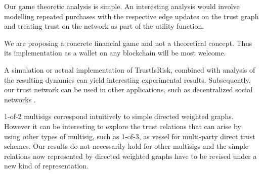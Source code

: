   Our game theoretic analysis is simple. An interesting analysis would involve modelling repeated purchases with the
  respective edge updates on the trust graph and treating trust on the network as part of the utility function.

  We are proposing a concrete financial game and not a theoretical concept. Thus its implementation as a wallet on any
  blockchain will be most welcome.

  A simulation or actual implementation of TrustIsRisk, combined with analysis of the resulting dynamics can yield
  interesting experimental results. Subsequently, our trust network can be used in other applications, such as decentralized
  social networks \cite{synereo}.

  1-of-2 multisigs correspond intuitively to simple directed weighted graphs. However it can be interesting to explore
  the trust relations that can arise by using other types of multisig, such as 1-of-3, as vessel for multi-party direct trust
  schemes. Our results do not necessarily hold for other multisigs and the simple relations now represented by directed
  weighted graphs have to be revised under a new kind of representation.
